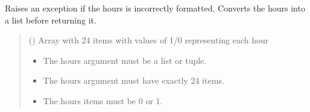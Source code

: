 \documentclass[letterpaper,10pt,english]{sphinxmanual}
\begin{document}
\begin{fulllineitems}
\begin{fulllineitems}
\begin{quote}
\begin{description}
\end{description}\end{quote}

\end{fulllineitems}


\begin{fulllineitems}
\label{\detokenize{Morelia.Devices:Morelia.Devices.PodDevice_8229.Pod8229._Validate_Hours}}
\pysigstartsignatures
{}
\pysigstopsignatures
\sphinxAtStartPar
Raises an exception if the hours is incorrectly formatted. Converts the hours         into a list before returning it.
\begin{quote}\begin{description}
\sphinxAtStartPar
{} (\sphinxstyleliteralemphasis{\sphinxupquote{ | }}\sphinxstyleliteralemphasis{\sphinxupquote{{[}}}\sphinxstyleliteralemphasis{\sphinxupquote{ | }}\sphinxstyleliteralemphasis{\sphinxupquote{{]}}}) \textendash{} Array with 24 items with values of 1/0                 representing each hour

\begin{itemize}
\item {} 
\sphinxAtStartPar
{} \textendash{} The hours argument must be a list or tuple.

\item {} 
\sphinxAtStartPar
{} \textendash{} The hours argument must have exactly 24 items.

\item {} 
\sphinxAtStartPar
{} \textendash{} The hours items must be 0 or 1.


\end{itemize}
\end{description}
\end{quote}
\end{fulllineitems}
\end{fulllineitems}
\end{document}
